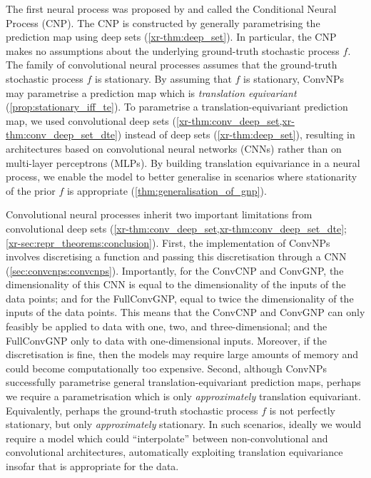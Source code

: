 \documentclass[12pt]{report}
\newcommand{\xrprefix}[1]{xr-#1}
\begin{document}
The first neural process was proposed by \textcite{Garnelo:2018:Conditional_Neural_Processes} and called the Conditional Neural Process (CNP).
The CNP is constructed by generally parametrising the prediction map using deep sets (\cref{\xrprefix{thm:deep_set}}).
In particular, the CNP makes no assumptions about the underlying ground-truth stochastic process $f$.
%
The family of convolutional neural processes assumes that the ground-truth stochastic process $f$ is stationary.
By assuming that $f$ is stationary, ConvNPs may parametrise a prediction map which is \emph{translation equivariant} (\cref{prop:stationary_iff_te}).
To parametrise a translation-equivariant prediction map, we used convolutional deep sets (\cref{\xrprefix{thm:conv_deep_set},\xrprefix{thm:conv_deep_set_dte}}) instead of deep sets (\cref{\xrprefix{thm:deep_set}}), resulting in architectures based on convolutional neural networks (CNNs) rather than on multi-layer perceptrons (MLPs).
By building translation equivariance in a neural process, we enable the model to better generalise in scenarios where stationarity of the prior $f$ is appropriate (\cref{thm:generalisation_of_gnp}).

Convolutional neural processes inherit two important limitations
from convolutional deep sets (\cref{\xrprefix{thm:conv_deep_set},\xrprefix{thm:conv_deep_set_dte}}; \cref{\xrprefix{sec:repr_theorems:conclusion}}).
First, the implementation of ConvNPs involves discretising a function and passing this discretisation through a CNN (\cref{sec:convcnps:convcnps}).
Importantly, for the ConvCNP and ConvGNP, the dimensionality of this CNN is equal to the dimensionality of the inputs of the data points; and for the FullConvGNP, equal to twice the dimensionality of the inputs of the data points.
This means that the ConvCNP and ConvGNP can only feasibly be applied to data with one, two, and three-dimensional;
and the FullConvGNP only to data with one-dimensional inputs.
Moreover, if the discretisation is fine, then the models may require large amounts of memory and could become computationally too expensive.
Second, although ConvNPs successfully parametrise general translation-equivariant prediction maps, perhaps we require a parametrisation which is only \emph{approximately} translation equivariant.
Equivalently, perhaps the ground-truth stochastic process $f$ is not perfectly stationary, but only \emph{approximately} stationary.
In such scenarios, ideally we would require a model which could ``interpolate'' between non-convolutional and convolutional architectures, automatically exploiting translation equivariance insofar that is appropriate for the data.
\end{document}
